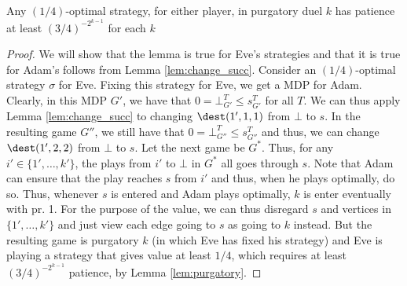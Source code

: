 \begin{lemma}
Any $(1/4)$-optimal strategy, for either player, in purgatory duel $k$ has patience at least $(3/4)^{-2^{k-1}}$ for each $k$
\end{lemma}
\begin{proof}
We will show that the lemma is true for Eve's strategies and that it is true for Adam's follows from Lemma \cref{lem:change_succ}.
Consider an $(1/4)$-optimal strategy $\sigma$ for Eve. Fixing this strategy for Eve, we get a MDP for Adam. Clearly, in this MDP $G'$, we have that $0=\bot^T_{G'}\leq s^T_{G'}$ for all $T$. We can thus apply Lemma \cref{lem:change_succ} to changing $\dest(1',1,1)$ from $\bot$ to $s$. In the resulting game $G''$, 
we still have that $0=\bot^T_{G''}\leq s^T_{G''}$ and thus, we can change $\dest(1',2,2)$ from $\bot$ to $s$.
Let the next game be $G^*$.
Thus, for any $i'\in \{1',\dots,k'\}$, the plays from $i'$ to $\bot$ in $G^*$ all goes through $s$. Note that Adam can ensure that the play reaches $s$ from $i'$ and thus, when he plays optimally, do so.
Thus, whenever $s$ is entered and Adam plays optimally, $k$ is enter eventually with pr. 1.
For the purpose of the value, we can thus disregard $s$ and vertices in $\{1',\dots,k'\}$ and just view each edge going to $s$ as going to $k$ instead.
But the resulting game is purgatory $k$ (in which Eve has fixed his strategy) and Eve is playing a strategy that gives value at least $1/4$, which requires  at least $(3/4)^{-2^{k-1}}$ patience, by Lemma \cref{lem:purgatory}.
\end{proof}
